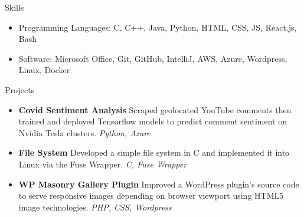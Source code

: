 \documentclass[]{mcdowellcv}
\begin{document}
\begin{cvsection}{Skills}
	\begin{cvsubsection}{}{}{}
		\begin{itemize}
			\item Programming Languages:  C, C++, Java, Python, HTML, CSS, JS, React.js, Bash
			\item Software:  Microsoft Office, Git, GitHub, IntelliJ, AWS, Azure, Wordpress, Linux, Docker
		\end{itemize}
	\end{cvsubsection}
\end{cvsection}
\begin{cvsection}{Projects}
	\begin{cvsubsection}{}{}{}
		\begin{itemize}
			\setlength\itemsep{3pt}
			\item \textbf{Covid Sentiment Analysis}  Scraped geolocated YouTube comments then trained and deployed Tensorflow models to predict comment sentiment on Nvidia Tesla clusters. \textit{Python, Azure}
			\item \textbf{File System}  Developed a simple file system in C and implemented it into Linux via the Fuse Wrapper. \textit{C, Fuse Wrapper}
			\item \textbf{WP Masonry Gallery Plugin}  Improved a WordPress plugin’s source code to serve responsive images depending on browser viewport using HTML5 image technologies. \textit{PHP, CSS, Wordpress}
		\end{itemize}
	\end{cvsubsection}
\end{cvsection}
\end{document}
